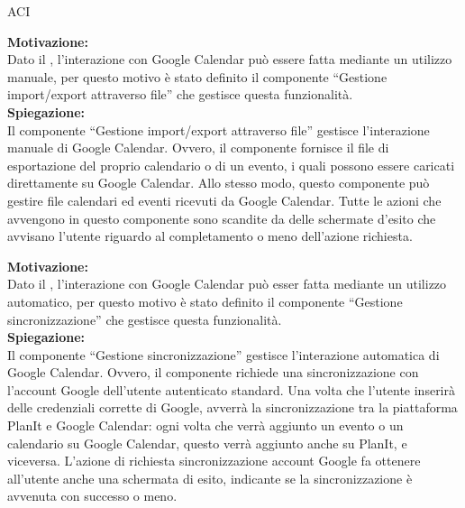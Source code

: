 \begin{listaPersonale}{ACI}

    \textbf{Motivazione:}\\
    Dato il , l'interazione con Google Calendar può essere fatta mediante un utilizzo manuale, per questo motivo è stato definito il componente “Gestione import/export attraverso file” che gestisce questa funzionalità.\\
    \textbf{Spiegazione:}\\
    Il componente “Gestione import/export attraverso file” gestisce l'interazione manuale di Google Calendar. Ovvero, il componente fornisce il file di esportazione del proprio calendario o di un evento, i quali possono essere caricati direttamente su Google Calendar. Allo stesso modo, questo componente può gestire file calendari ed eventi ricevuti da Google Calendar. Tutte le azioni che avvengono in questo componente sono scandite da delle schermate d'esito che avvisano l'utente riguardo al completamento o meno dell'azione richiesta.



    \textbf{Motivazione:}\\
    Dato il , l'interazione con Google Calendar può esser fatta mediante un utilizzo automatico, per questo motivo è stato definito il componente “Gestione sincronizzazione” che gestisce questa funzionalità.\\
    \textbf{Spiegazione:}\\
    Il componente “Gestione sincronizzazione” gestisce l'interazione automatica di Google Calendar. Ovvero, il componente richiede una sincronizzazione con l'account Google dell'utente autenticato standard. Una volta che l'utente inserirà delle credenziali corrette di Google, avverrà la sincronizzazione tra la piattaforma PlanIt e Google Calendar: ogni volta che verrà aggiunto un evento o un calendario su Google Calendar, questo verrà aggiunto anche su PlanIt, e viceversa. L'azione di richiesta sincronizzazione account Google fa ottenere all'utente anche una schermata di esito, indicante se la sincronizzazione è avvenuta con successo o meno.




\end{listaPersonale}

